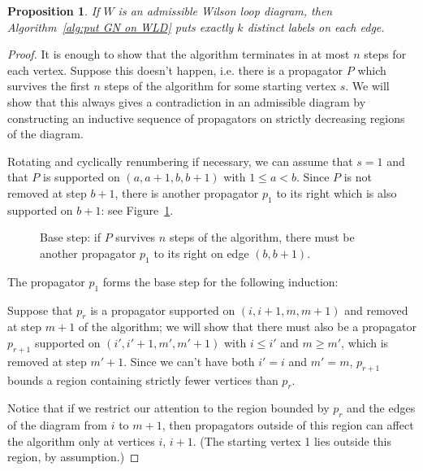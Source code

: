 \documentclass[11pt]{article}
\newcommand{\drawWLD}[2]{

\pgfmathsetmacro{\n}{#1}
\pgfmathsetmacro{\radius}{#2}
\pgfmathsetmacro{\angle}{360/\n}
    \foreach \i in {1,2,...,\n} {
      \pgfmathsetmacro{\x}{\angle*\i}
        \draw[-,shorten >=-\radius*0.1 cm,shorten <=-\radius*0.1 cm]  (\x:\radius cm)-- (\x + \angle: \radius cm);
    }

\draw (\angle:\radius) node {$\bullet$};
}
\newcommand{\drawprop}[4]{
\pgfmathsetmacro{\r}{#1}
\pgfmathsetmacro{\bumpr}{#2}
\pgfmathsetmacro{\s}{#3}
\pgfmathsetmacro{\bumps}{#4}
\pgfmathsetmacro{\perturbe}{\angle/\n}

\begin{scope}
\clip (\angle*\r:\radius) -- (\angle + \angle*\r:\radius) -- (\angle*\s:\radius) -- (\angle + \angle*\s:\radius) -- (\angle*\r:\radius);
\draw[propagator] (\angle*\r + \angle/2 + \bumpr*\perturbe:\radius) -- (\angle*\s + \angle/2 + \bumps*\perturbe:\radius);
\end{scope}
}
\newtheorem{prop}[thm]{Proposition}
\theoremstyle{remark}
\theoremstyle{definition}
\begin{document}
\begin{prop}\label{res:alg k labels}
If $W$ is an admissible Wilson loop diagram, then Algorithm~\ref{alg:put GN on WLD} puts exactly $k$ distinct labels on each edge.
\end{prop}
\begin{proof}
It is enough to show that the algorithm terminates in at most $n$ steps for each vertex.  Suppose this doesn't happen, i.e. there is a propagator $P$ which survives the first $n$ steps of the algorithm for some starting vertex $s$.  We will show that this always gives a contradiction in an admissible diagram by constructing an inductive sequence of propagators on strictly decreasing regions of the diagram.

Rotating and cyclically renumbering if necessary, we can assume that $s=1$ and that $P$ is supported on $(a,a+1,b,b+1)$ with $1 \leq a < b$.  Since $P$ is not removed at step $b+1$, there is another propagator $p_1$ to its right which is also supported on $b+1$: see Figure~\ref{fig:base step of alg induction}.

\begin{figure}
\caption{Base step: if $P$ survives $n$ steps of the algorithm, there must be another propagator $p_1$ to its right on edge $(b,b+1)$.}
\label{fig:base step of alg induction}
\end{figure}

The propagator $p_1$ forms the base step for the following induction:

Suppose that $p_r$ is a propagator supported on $(i,i+1,m,m+1)$ and removed at step $m+1$ of the algorithm; we will show that there must also be a propagator $p_{r+1}$ supported on $(i',i'+1,m',m'+1)$ with $i \leq i'$ and $m \geq m'$, which is removed at step $m'+1$.  Since we can't have both $i' = i$ and $m'=m$, $p_{r+1}$ bounds a region containing strictly fewer vertices than $p_r$.

Notice that if we restrict our attention to the region bounded by $p_r$ and the edges of the diagram from $i$ to $m+1$, then propagators outside of this region can affect the algorithm only at vertices $i$, $i+1$.  (The starting vertex 1 lies outside this region, by assumption.)


\end{proof}
\end{document}
